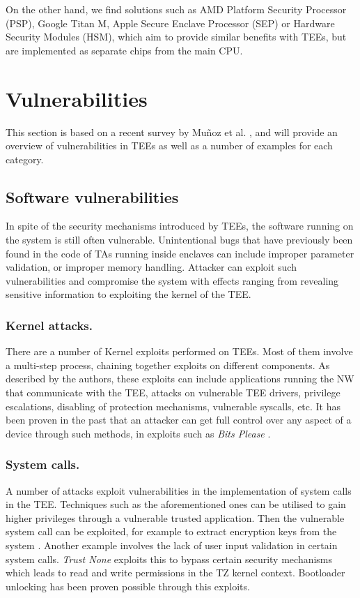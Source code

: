 \documentclass[runningheads,a4paper]{uwsese}
\begin{document}
On the other hand, we find solutions such as AMD Platform Security Processor
(PSP), Google Titan M, Apple Secure Enclave Processor (SEP) or Hardware
Security Modules (HSM), which aim to provide similar benefits with TEEs, but
are implemented as separate chips from the main CPU.

\section{Vulnerabilities}

This section is based on a recent survey by Muñoz et al.
\cite{tee_in_securities}, and will provide an overview of vulnerabilities in
TEEs as well as a number of examples for each category.

\subsection{Software vulnerabilities}

In spite of the security mechanisms introduced by TEEs, the software running on
the system is still often vulnerable. Unintentional bugs that have previously
been found in the code of TAs running inside enclaves can include improper
parameter validation, or improper memory handling. Attacker can exploit such
vulnerabilities and compromise the system with effects ranging from revealing
sensitive information to exploiting the kernel of the TEE.

\subsubsection{Kernel attacks.}

There are a number of Kernel exploits performed on TEEs. Most of them involve a
multi-step process, chaining together exploits on different components. As
described by the authors, these exploits can include applications running the
NW that communicate with the TEE, attacks on vulnerable TEE drivers, privilege
escalations, disabling of protection mechanisms, vulnerable syscalls, etc. It
has been proven in the past that an attacker can get full control over any
aspect of a device through such methods, in exploits such as \emph{Bits Please}
\cite{bits_please}. 

\subsubsection{System calls.}

A number of attacks exploit vulnerabilities in the implementation of system
calls in the TEE. Techniques such as the aforementioned ones can be utilised
to gain higher privileges through a vulnerable trusted application. Then the
vulnerable system call can be exploited, for example to extract encryption keys
from the system \cite{bits_fde}. Another example involves the lack of user
input validation in certain system calls. \emph{Trust None} \cite{trust_none}
exploits this to bypass certain security mechanisms which leads to read and write
permissions in the TZ kernel context. Bootloader unlocking has been proven 
possible through this exploits.
\end{document}
